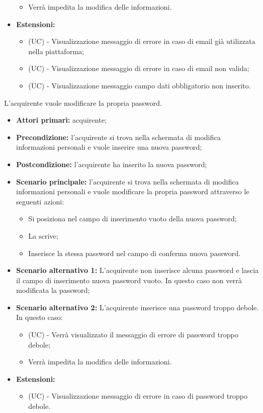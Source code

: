\begin{itemize}
\begin{itemize}
        \item Verrà impedita la modifica delle informazioni.
    \end{itemize}
    \item \textbf{Estensioni:}
    \begin{itemize}
        \item (UC) - Visualizzazione messaggio di errore in caso di email già utilizzata nella piattaforma;
        \item (UC) - Visualizzazione messaggio di errore in caso di email non valida;
        \item (UC) - Visualizzazione messaggio campo dati obbligatorio non inserito.
    \end{itemize}
\end{itemize}

L'acquirente vuole modificare la propria password.
\begin{itemize}
    \item \textbf{Attori primari:} acquirente;
    \item \textbf{Precondizione:} l'acquirente si trova nella schermata di modifica informazioni personali e vuole inserire una nuova password;
    \item \textbf{Postcondizione:} l'acquirente ha inserito la nuova password;
    \item \textbf{Scenario principale:} l'acquirente si trova nella schermata di modifica informazioni personali e vuole modificare la propria password attraverso le seguenti azioni:
        \begin{itemize}
            \item Si posiziona nel campo di inserimento vuoto della nuova password;
            \item La scrive;
            \item Inserisce la stessa password nel campo di conferma nuova password.
        \end{itemize}
    \item \textbf{Scenario alternativo 1:} L'acquirente non inserisce alcuna password e lascia il campo di inserimento nuova password vuoto. In questo caso non verrà modificata la password;
    \item \textbf{Scenario alternativo 2:} L'acquirente inserisce una password troppo debole. In questo caso:
    \begin{itemize}
        \item (UC) - Verrà visualizzato il messaggio di errore di password troppo debole;
        \item Verrà impedita la modifica delle informazioni.
    \end{itemize}
    \item \textbf{Estensioni:}
    \begin{itemize}
        \item (UC) - Visualizzazione messaggio di errore in caso di password troppo debole.
    \end{itemize}
\end{itemize}

